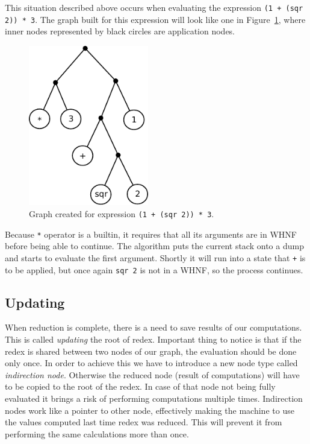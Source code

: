 \documentclass[12pt,a4paper]{report}
\begin{document}
This situation described above occurs when evaluating the expression \texttt{(1
+ (sqr 2)) * 3}. The graph built for this expression will look like one in
Figure~\ref{fig:expression_graph}, where inner nodes represented by black
circles are application nodes.

\vspace*{0.2in}
\begin{figure}[h!]
  \centering
  \includegraphics[height=7cm]{gmachine_graph}
  \caption{Graph created for expression \texttt{(1 + (sqr 2)) * 3}.}
  \label{fig:expression_graph}
\end{figure}

Because \texttt{*} operator is a builtin, it requires that all its arguments
are in WHNF before being able to continue. The algorithm puts the current stack
onto a dump and starts to evaluate the first argument. Shortly it will run into
a state that \texttt{+} is to be applied, but once again \texttt{sqr 2} is not
in a WHNF, so the process continues.

\subsection{Updating}
\label{sec:updating}
When reduction is complete, there is a need to save results of our
computations. This is called \textit{updating} the root of redex. Important
thing to notice is that if the redex is shared between two nodes of our graph,
the evaluation should be done only once. In order to achieve this we have to
introduce a new node type called \textit{indirection node}. Otherwise the
reduced node (result of computations) will have to be copied to the root of
the redex. In case of that node not being fully evaluated it brings a risk of
performing computations multiple times. Indirection nodes work like a pointer
to other node, effectively making the machine to use the values computed last
time redex was reduced. This will prevent it from performing the same
calculations more than once.
\end{document}
